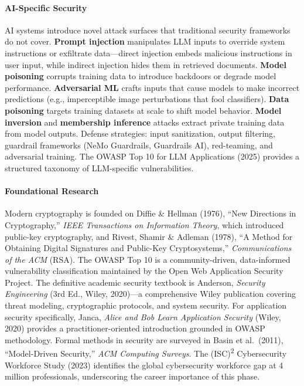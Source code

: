 \documentclass[11pt, a4paper, oneside]{report}
\begin{document}
\paragraph{AI-Specific Security}
AI systems introduce novel attack surfaces that traditional security frameworks do not cover. \textbf{Prompt injection} manipulates LLM inputs to override system instructions or exfiltrate data---direct injection embeds malicious instructions in user input, while indirect injection hides them in retrieved documents. \textbf{Model poisoning} corrupts training data to introduce backdoors or degrade model performance. \textbf{Adversarial ML} crafts inputs that cause models to make incorrect predictions (e.g., imperceptible image perturbations that fool classifiers). \textbf{Data poisoning} targets training datasets at scale to shift model behavior. \textbf{Model inversion} and \textbf{membership inference} attacks extract private training data from model outputs. Defense strategies: input sanitization, output filtering, guardrail frameworks (NeMo Guardrails, Guardrails AI), red-teaming, and adversarial training. The OWASP Top 10 for LLM Applications (2025) provides a structured taxonomy of LLM-specific vulnerabilities.


\paragraph{Foundational Research} Modern cryptography is founded on Diffie \& Hellman (1976), ``New Directions in Cryptography,'' \emph{IEEE Transactions on Information Theory}, which introduced public-key cryptography, and Rivest, Shamir \& Adleman (1978), ``A Method for Obtaining Digital Signatures and Public-Key Cryptosystems,'' \emph{Communications of the ACM} (RSA). The OWASP Top 10 is a community-driven, data-informed vulnerability classification maintained by the Open Web Application Security Project. The definitive academic security textbook is Anderson, \emph{Security Engineering} (3rd Ed., Wiley, 2020)---a comprehensive Wiley publication covering threat modeling, cryptographic protocols, and system security. For application security specifically, Janca, \emph{Alice and Bob Learn Application Security} (Wiley, 2020) provides a practitioner-oriented introduction grounded in OWASP methodology. Formal methods in security are surveyed in Basin et al.\ (2011), ``Model-Driven Security,'' \emph{ACM Computing Surveys}. The (ISC)\textsuperscript{2} Cybersecurity Workforce Study (2023) identifies the global cybersecurity workforce gap at 4 million professionals, underscoring the career importance of this phase.
\end{document}
